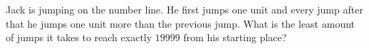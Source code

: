 Jack is jumping on the number line. He first jumps one unit and every jump after that he jumps one unit more than the previous jump. What is the least amount of jumps it takes to reach exactly $19999$ from his starting place?